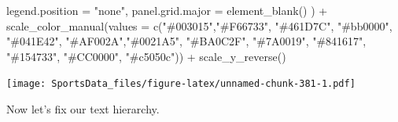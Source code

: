\documentclass[
]{book}
\newenvironment{Shaded}{\begin{snugshade}}{\end{snugshade}}
\newcommand{\AttributeTok}[1]{\textcolor[rgb]{0.77,0.63,0.00}{#1}}
\newcommand{\FunctionTok}[1]{\textcolor[rgb]{0.00,0.00,0.00}{#1}}
\newcommand{\NormalTok}[1]{#1}
\newcommand{\SpecialCharTok}[1]{\textcolor[rgb]{0.00,0.00,0.00}{#1}}
\newcommand{\StringTok}[1]{\textcolor[rgb]{0.31,0.60,0.02}{#1}}
\begin{document}
\begin{Shaded}
\begin{Highlighting}[]
    \AttributeTok{legend.position =} \StringTok{"none"}\NormalTok{,}
    \AttributeTok{panel.grid.major =} \FunctionTok{element\_blank}\NormalTok{()}
\NormalTok{    ) }\SpecialCharTok{+}
  \FunctionTok{scale\_color\_manual}\NormalTok{(}\AttributeTok{values =} \FunctionTok{c}\NormalTok{(}\StringTok{"\#003015"}\NormalTok{,}\StringTok{"\#F66733"}\NormalTok{, }\StringTok{"\#461D7C"}\NormalTok{, }\StringTok{"\#bb0000"}\NormalTok{, }\StringTok{"\#041E42"}\NormalTok{, }\StringTok{"\#AF002A"}\NormalTok{,}\StringTok{"\#0021A5"}\NormalTok{, }\StringTok{"\#BA0C2F"}\NormalTok{, }\StringTok{"\#7A0019"}\NormalTok{, }\StringTok{"\#841617"}\NormalTok{, }\StringTok{"\#154733"}\NormalTok{, }\StringTok{"\#CC0000"}\NormalTok{, }\StringTok{"\#c5050c"}\NormalTok{)) }\SpecialCharTok{+}
  \FunctionTok{scale\_y\_reverse}\NormalTok{() }
\end{Highlighting}
\end{Shaded}

\texttt{[image: SportsData\_files/figure-latex/unnamed-chunk-381-1.pdf]}

Now let's fix our text hierarchy.
\end{document}
